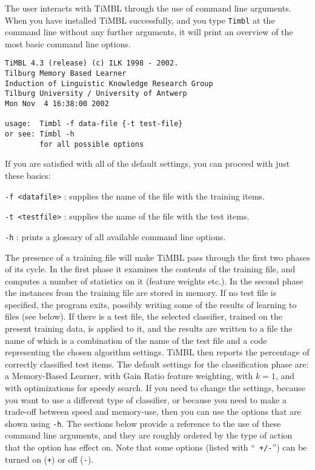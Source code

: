 \documentclass{report}
\begin{document}
The user interacts with TiMBL through the use of command line arguments.
When you have installed TiMBL successfully, and you type {\tt Timbl} at the
command line without any further arguments, it will print an overview
of the most basic command line options. 

\begin{verbatim}
TiMBL 4.3 (release) (c) ILK 1998 - 2002.
Tilburg Memory Based Learner
Induction of Linguistic Knowledge Research Group
Tilburg University / University of Antwerp
Mon Nov  4 16:38:00 2002

usage:  Timbl -f data-file {-t test-file}
or see: Timbl -h
        for all possible options
\end{verbatim}

If you are satisfied with all of the default settings, you can proceed
with just these basics:

\begin{description}

\item {\tt -f <datafile>} : supplies the name of the file with the
training items.
\item {\tt -t <testfile>} : supplies the name of the file with the
test items.
\item {\tt -h} : prints a glossary of all available command line 
options.

\end{description}

The presence of a training file will make TiMBL pass through the first
two phases of its cycle. In the first phase it examines the contents
of the training file, and computes a number of statistics on it
(feature weights etc.). In the second phase the instances from the
training file are stored in memory. If no test file is specified, the
program exits, possibly writing some of the results of learning to
files (see below). If there is a test file, the selected classifier,
trained on the present training data, is applied to it, and the
results are written to a file the name of which is a combination of the
name of the test file and a code representing the chosen algorithm
settings. TiMBL then reports the percentage of correctly classified
test items. The default settings for the classification phase are: a
Memory-Based Learner, with Gain Ratio feature weighting, with $k=1$,
and with optimizations for speedy search. If you need to change the
settings, because you want to use a different type of classifier, or
because you need to make a trade-off between speed and memory-use,
then you can use the options that are shown using {\tt -h}. The
sections below provide a reference to the use of these command line
arguments, and they are roughly ordered by the type of action that the
option has effect on. Note that some options (listed with ``{\tt
+/-}'') can be turned on ({\tt +}) or off ({\tt -}).
\end{document}
